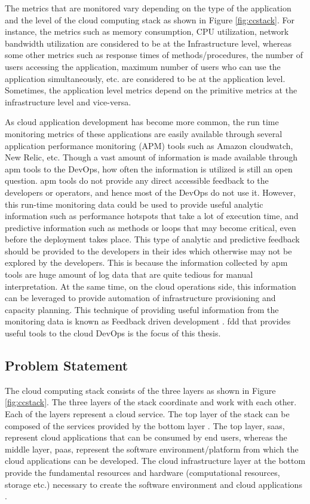 \documentclass[article,type=msc,colorback,12pt,accentcolor=tud8b,table]{tudthesis}
\begin{document}
	\par The metrics that are monitored vary depending on the type of the application and the level of the cloud computing stack as shown in Figure \ref{fig:ccstack}. For instance, the metrics such as memory consumption, CPU utilization, network bandwidth utilization are considered to be at the Infrastructure level, whereas some other metrics such as response times of methods/procedures, the number of users accessing the application, maximum number of users who can use the application simultaneously, etc. are considered to be at the application level. Sometimes, the application level metrics depend on the primitive metrics at the infrastructure level and vice-versa.
	
	\par As cloud application development has become more common, the run time monitoring metrics of these applications are easily available through several application performance monitoring (APM) tools such as Amazon cloudwatch, New Relic, etc. Though a vast amount of information is made available through \gls{apm} tools to the DevOps, how often the information is utilized is still an open question. \gls{apm} tools do not provide any direct accessible feedback to the developers or operators, and hence most of the DevOps do not use it. However, this run-time monitoring data could be used to provide useful analytic information such as performance hotspots that take a lot of execution time, and predictive information such as methods or loops that may become critical, even before the deployment takes place. This type of analytic and predictive feedback should be provided to the developers in their \gls{ide}s which otherwise may not be explored by the developers. This is because the information collected by \gls{apm} tools are huge amount of log data that are quite tedious for manual interpretation. At the same time, on the cloud operations side, this information can be leveraged to provide automation of infrastructure provisioning and capacity planning. This technique of providing useful information from the monitoring data is known as Feedback driven development \cite{cito2015runtime}. \gls{fdd} that provides useful tools to the cloud DevOps is the focus of this thesis.	
	
	\subsection{Problem Statement}	
	
The cloud computing stack consists of the three layers as shown in Figure \ref{fig:ccstack}. The three layers of the stack coordinate and work with each other. Each of the layers represent a cloud service. The top layer of the stack can be composed of the services provided by the bottom layer \cite{youseff2008toward}. The top layer, \gls{saas}, represent cloud applications that can be consumed by end users, whereas the middle layer, \gls{paas}, represent the software environment/platform from which the cloud applications can be developed. The cloud infrastructure layer at the bottom provide the fundamental resources and hardware (computational resources, storage etc.) necessary to create the software environment and cloud applications \cite{youseff2008toward}.  
\end{document}
